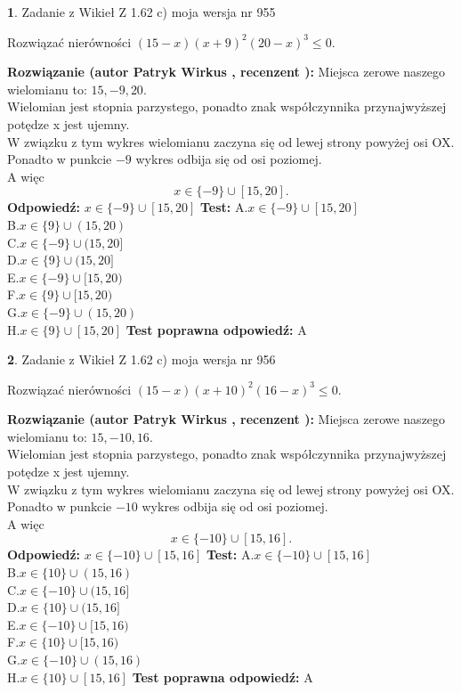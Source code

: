 \documentclass[12pt, a4paper]{article}
\theoremstyle{definition} %
\newtheorem{zad}{}
\newcommand{\zadStart}[1]{\begin{zad}#1\newline}
\newcommand{\zadStop}{\end{zad}}
\newcommand{\rozwStart}[2]{\noindent \textbf{Rozwiązanie (autor #1 , recenzent #2): }\newline}
\newcommand{\rozwStop}{\newline}
\newcommand{\odpStart}{\noindent \textbf{Odpowiedź:}\newline}
\newcommand{\odpStop}{\newline}
\newcommand{\testStart}{\noindent \textbf{Test:}\newline}
\newcommand{\testStop}{\newline}
\newcommand{\kluczStart}{\noindent \textbf{Test poprawna odpowiedź:}\newline}
\newcommand{\kluczStop}{\newline}
\begin{document}
\zadStart{Zadanie z Wikieł Z 1.62 c) moja wersja nr 955}

Rozwiązać nierówności $(15-x)(x+9)^{2}(20-x)^{3}\le0$.
\zadStop
\rozwStart{Patryk Wirkus}{}
Miejsca zerowe naszego wielomianu to: $15, -9, 20$.\\
Wielomian jest stopnia parzystego, ponadto znak współczynnika przy\linebreak najwyższej potędze x jest ujemny.\\ W związku z tym wykres wielomianu zaczyna się od lewej strony powyżej osi OX.\\
Ponadto w punkcie $-9$ wykres odbija się od osi poziomej.\\
A więc $$x \in \{-9\} \cup [15,20].$$
\rozwStop
\odpStart
$x \in \{-9\} \cup [15,20]$
\odpStop
\testStart
A.$x \in \{-9\} \cup [15,20]$\\
B.$x \in \{9\} \cup (15,20)$\\
C.$x \in \{-9\} \cup (15,20]$\\
D.$x \in \{9\} \cup (15,20]$\\
E.$x \in \{-9\} \cup [15,20)$\\
F.$x \in \{9\} \cup [15,20)$\\
G.$x \in \{-9\} \cup (15,20)$\\
H.$x \in \{9\} \cup [15,20]$
\testStop
\kluczStart
A
\kluczStop



\zadStart{Zadanie z Wikieł Z 1.62 c) moja wersja nr 956}

Rozwiązać nierówności $(15-x)(x+10)^{2}(16-x)^{3}\le0$.
\zadStop
\rozwStart{Patryk Wirkus}{}
Miejsca zerowe naszego wielomianu to: $15, -10, 16$.\\
Wielomian jest stopnia parzystego, ponadto znak współczynnika przy\linebreak najwyższej potędze x jest ujemny.\\ W związku z tym wykres wielomianu zaczyna się od lewej strony powyżej osi OX.\\
Ponadto w punkcie $-10$ wykres odbija się od osi poziomej.\\
A więc $$x \in \{-10\} \cup [15,16].$$
\rozwStop
\odpStart
$x \in \{-10\} \cup [15,16]$
\odpStop
\testStart
A.$x \in \{-10\} \cup [15,16]$\\
B.$x \in \{10\} \cup (15,16)$\\
C.$x \in \{-10\} \cup (15,16]$\\
D.$x \in \{10\} \cup (15,16]$\\
E.$x \in \{-10\} \cup [15,16)$\\
F.$x \in \{10\} \cup [15,16)$\\
G.$x \in \{-10\} \cup (15,16)$\\
H.$x \in \{10\} \cup [15,16]$
\testStop
\kluczStart
A
\kluczStop
\end{document}

